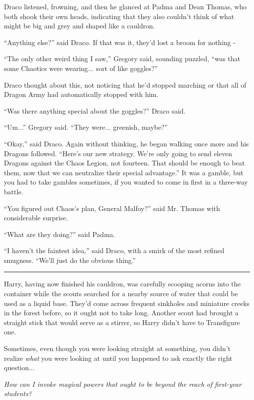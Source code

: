Draco listened, frowning, and then he glanced at Padma and Dean Thomas,
who both shook their own heads, indicating that they also couldn't think
of what might be big and grey and shaped like a cauldron.

``Anything else?'' said Draco. If that was it, they'd lost a broom for
nothing -

``The only other weird thing I saw,'' Gregory said, sounding puzzled,
``was that some Chaotics were wearing... sort of like goggles?''

Draco thought about this, not noticing that he'd stopped marching or
that all of Dragon Army had automatically stopped with him.

``Was there anything special about the goggles?'' Draco said.

``Um...'' Gregory said. ``They were... greenish, maybe?''

``Okay,'' said Draco. Again without thinking, he began walking once more
and his Dragons followed. ``Here's our new strategy. We're only going to
send eleven Dragons against the Chaos Legion, not fourteen. That should
be enough to beat them, now that we can neutralize their special
advantage.'' It was a gamble, but you had to take gambles sometimes, if
you wanted to come in first in a three-way battle.

``You figured out Chaos's plan, General Malfoy?'' said Mr. Thomas with
considerable surprise.

``What are they doing?'' said Padma.

``I haven't the faintest idea,'' said Draco, with a smirk of the most
refined smugness. ``We'll just do the obvious thing.''

\begin{center}\rule{3in}{0.4pt}\end{center}

Harry, having now finished his cauldron, was carefully scooping acorns
into the container while the scouts searched for a nearby source of
water that could be used as a liquid base. They'd come across frequent
sinkholes and miniature creeks in the forest before, so it ought not to
take long. Another scout had brought a straight stick that would serve
as a stirrer, so Harry didn't have to Transfigure one.

Sometimes, even though you were looking straight at something, you
didn't realize \emph{what} you were looking at until you happened to ask
exactly the right question...

\emph{How can I invoke magical powers that ought to be beyond the reach
of first-year students?}

